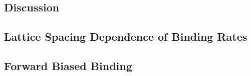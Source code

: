 \documentclass[11pt]{article}
\begin{document}
\begin{multicols}{2}
\section*{Discussion}


\subsection*{Lattice Spacing Dependence of Binding Rates}


\subsection*{Forward Biased Binding}




\end{multicols}
\end{document}

